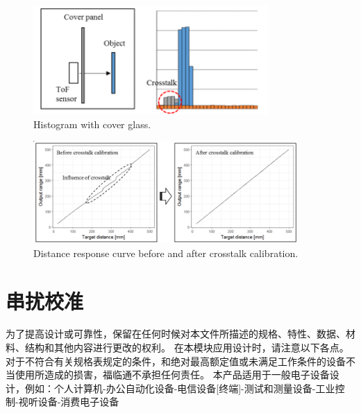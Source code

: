 \documentclass{scrreprt}
\begin{document}
\begin{CJK*}{UTF8}{gbsn}
\begin{figure}[H]
\center\includegraphics[width=0.8\textwidth]{hist_glass.png}
\caption{Histogram with cover glass.}
\label{fig:cover}
\end{figure}

\begin{figure}[H]
\center\includegraphics[width=0.9\textwidth]{crosstalk_calib.png}
\caption{Distance response curve before and after crosstalk calibration.}
\end{figure}

\chapter{串扰校准}
为了提高设计或可靠性，保留在任何时候对本文件所描述的规格、特性、数据、材料、结构和其他内容进行更改的权利。
在本模块应用设计时，请注意以下各点。
对于不符合有关规格表规定的条件，和绝对最高额定值或未满足工作条件的设备不当使用所造成的损害，福临通不承担任何责任。
本产品适用于一般电子设备设计，例如：个人计算机-办公自动化设备-电信设备[终端]-测试和测量设备-工业控制-视听设备-消费电子设备

\end{CJK*}
\end{document}
